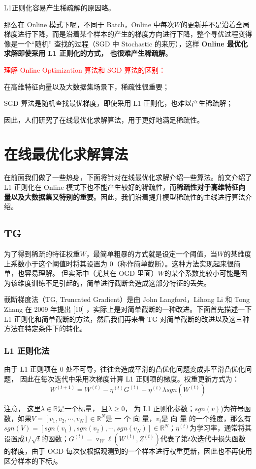 \documentclass[12pt]{article}
\begin{document}
L1正则化容易产生稀疏解的原因略。

那么在 Online 模式下呢，不同于 Batch，Online 中每次$W$的更新并不是沿着全局梯度进行下降，而是沿着某个样本的产生的梯度方向进行下降，整个寻优过程变得像是一个“随机” 查找的过程（SGD 中 Stochastic 的来历），这样 \textbf{Online 最优化求解即使采用 L1 正则化的方式， 也很难产生稀疏解}。

\begin{framed}
\textcolor{red}{理解 Online Optimization 算法和 SGD 算法的区别：}

在高维特征向量以及大数据集场景下，稀疏性很重要；

SGD 算法是随机查找最优梯度，即使采用 L1 正则化，也难以产生稀疏解；

因此，人们研究了在线最优化求解算法，用于更好地满足稀疏性。
\end{framed}

\section{在线最优化求解算法}
在前面我们做了一些热身，下面将针对在线最优化求解介绍一些算法。前文介绍了 L1 正则化在 Online 模式下也不能产生较好的稀疏性，而\textbf{稀疏性对于高维特征向量以及大数据集又特别的重要}。因此，我们沿着提升模型稀疏性的主线进行算法介绍。

\subsection{TG}
为了得到稀疏的特征权重$W$，最简单粗暴的方式就是设定一个阈值，当$W$的某维度上系数小于这个阈值时将其设置为 0（称作简单截断）。这种方法实现起来很简单，也容易理解。 但实际中（尤其在 OGD 里面）$W$的某个系数比较小可能是因为该维度训练不足引起的，简单进行截断会造成这部分特征的丢失。

截断梯度法（TG, Truncated Gradient）是由 John Langford，Lihong Li 和 Tong Zhang 在 2009 年提出 [10] ，实际上是对简单截断的一种改进。下面首先描述一下 L1 正则化和简单截断的方法，然后我们再来看 TG 对简单截断的改进以及这三种方法在特定条件下的转化。

\subsubsection{L1 正则化法}
由于 L1 正则项在 0 处不可导，往往会造成平滑的凸优化问题变成非平滑凸优化问题， 因此在每次迭代中采用次梯度计算 L1 正则项的梯度。权重更新方式为：
$$
W^{(t+1)} = W^{(t)} - \eta^{(t)}G^{(t)} - \eta^{(t)}\lambda sgn(W^{(t)})
$$

注意， 这里$\lambda \in \mathbb{R}$是一个标量， 且$\lambda \ge 0$， 为 L1 正则化参数；$sgn(v)$)为符号函数，如果$V = [v_1, v_2, \cdots, v_N] \in \mathbb{R}^N$是 一 个 向 量，$v_i$是 向 量 的一个维度，那么有$sgn(V) = [sgn(v_1), sgn(v_2), \cdots, sgn(v_N)] \in \mathbb{R}^N$；$\eta^{(t)}$为学习率，通常将其设置成$1/\sqrt{t}$的函数；$G^{(t)} = \triangledown_W\ell(W^{(t)}, Z^{(t)})$代表了第$t$次迭代中损失函数的梯度，由于 OGD 每次仅根据观测到的一个样本进行权重更新，因此也不再使用区分样本的下标$j$。
\end{document}

